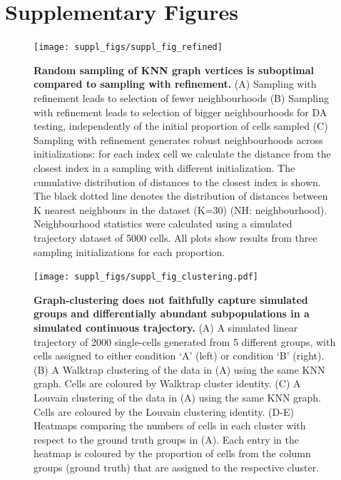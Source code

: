 \documentclass[
]{article}
\author{}
\date{\vspace{-2.5em}}
\begin{document}
\renewcommand{\figurename}{Supplementary Figure}
\renewcommand{\tablename}{Supplementary Table}

\newpage

\hypertarget{supplementary-figures}{%
\section*{Supplementary Figures}\label{supplementary-figures}}

\begin{figure}
\texttt{[image: suppl\_figs/suppl\_fig\_refined]} \caption{\textbf{Random sampling of KNN graph vertices is suboptimal compared to sampling with refinement.}
(A) Sampling with refinement leads to selection of fewer neighbourhoods
(B) Sampling with refinement leads to selection of bigger neighbourhoods for DA testing, independently of the initial proportion of cells sampled
(C) Sampling with refinement generates robust neighbourhoods across initializations: for each index cell we calculate the distance from the closest index in a sampling with different initialization. The cumulative distribution of distances to the closest index is shown. The black dotted line denotes the distribution of distances between K nearest neighbours in the dataset (K=30) (NH: neighbourhood).
Neighbourhood statistics were calculated using a simulated trajectory dataset of 5000 cells. All plots show results from three sampling initializations for each proportion.}\label{fig:sup-fig-refined}
\end{figure}







\begin{figure}
\centering
\texttt{[image: suppl\_figs/suppl\_fig\_clustering.pdf]}
\caption{\label{fig:sup-fig-clustering}\textbf{Graph-clustering does not faithfully capture simulated groups and differentially abundant subpopulations in a simulated continuous trajectory.}
(A) A simulated linear trajectory of 2000 single-cells generated from 5 different groups, with cells assigned to either condition `A' (left) or condition `B' (right).
(B) A Walktrap clustering of the data in (A) using the same KNN graph. Cells are coloured by Walktrap cluster identity.
(C) A Louvain clustering of the data in (A) using the same KNN graph. Cells are coloured by the Louvain clustering identity.
(D-E) Heatmaps comparing the numbers of cells in each cluster with respect to the ground truth groups in (A). Each entry in the heatmap is coloured by the proportion of cells from the column groups (ground truth) that are assigned to the respective cluster.}
\end{figure}
\end{document}
